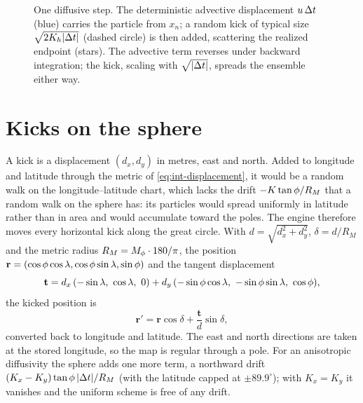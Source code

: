 \begin{figure}[t]
\centering
{}
\caption{One diffusive step. The deterministic advective displacement $u\,\Delta t$ (blue) carries the particle
from $x_n$; a random kick of typical size $\sqrt{2K_h|\Delta t|}$ (dashed circle) is then added, scattering the
realized endpoint (stars). The advective term reverses under backward integration; the kick, scaling with
$\sqrt{|\Delta t|}$, spreads the ensemble either way.}
\label{fig:diffusion}
\end{figure}

\section{Kicks on the sphere}\label{sec:diff-sphere}

A kick is a displacement $(d_x,d_y)$ in metres, east and north. Added to longitude and latitude through the
metric of \cref{eq:int-displacement}, it would be a random walk on the longitude--latitude chart, which lacks
the drift $-K\tan\phi/R_M$ that a random walk on the sphere has: its particles would spread uniformly in
latitude rather than in area and would accumulate toward the poles. The engine therefore moves every
horizontal kick along the great circle. With $d=\sqrt{d_x^2+d_y^2}$, $\delta=d/R_M$ and the metric radius $R_M=M_{\phi}\cdot180/\pi$,
the position $\mathbf{r}=(\cos\phi\cos\lambda,\cos\phi\sin\lambda,\sin\phi)$ and the tangent displacement
\begin{equation}\label{eq:diff-tangent}
  \mathbf{t}=d_x\,(-\sin\lonx,\ \cos\lonx,\ 0)+d_y\,(-\sin\latx\cos\lonx,\ -\sin\latx\sin\lonx,\ \cos\latx),
\end{equation}
the kicked position is
\begin{equation}\label{eq:diff-expmap}
  \mathbf{r}'=\mathbf{r}\cos\delta+\frac{\mathbf{t}}{d}\sin\delta ,
\end{equation}
converted back to longitude and latitude. The east and north directions are taken at the stored longitude,
so the map is regular through a pole. For an anisotropic diffusivity the sphere adds one more term, a
northward drift $(K_x-K_y)\tan\phi\,\lvert\Delta t\rvert/R_M$ (with the latitude capped at $\pm89.9^\circ$); with
$K_x=K_y$ it vanishes and the uniform scheme is free of any drift.

